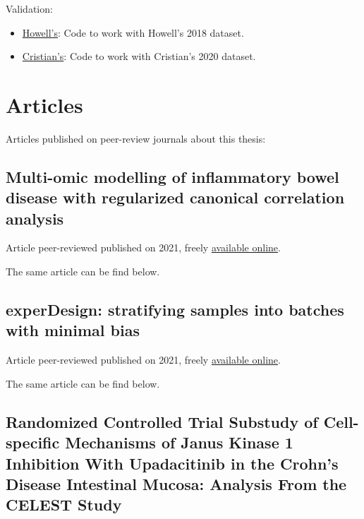 \documentclass[
  12pt,
  a4paper,
  twoside,
  openright]{book}
\providecommand{\tightlist}{%
  \setlength{\itemsep}{0pt}\setlength{\parskip}{0pt}}
\begin{document}
Validation:

\begin{itemize}
\tightlist
\item
  \href{https://github.com/llrs/howell_2018/}{Howell's}: Code to work with Howell's 2018 dataset.
\item
  \href{https://github.com/llrs/cristian_mark/}{Cristian's}: Code to work with Cristian's 2020 dataset.
\end{itemize}

\hypertarget{articles}{%
\chapter{Articles}\label{articles}}

Articles published on peer-review journals about this thesis:

\hypertarget{app-multiomics}{%
\section{Multi-omic modelling of inflammatory bowel disease with regularized canonical correlation analysis}\label{app-multiomics}}


Article peer-reviewed published on 2021, freely \href{https://doi.org/10.1371/journal.pone.0246367}{available online}.

The same article can be find below.



\hypertarget{app-experDesign}{%
\section{experDesign: stratifying samples into batches with minimal bias}\label{app-experDesign}}


Article peer-reviewed published on 2021, freely \href{https://joss.theoj.org/papers/10.21105/joss.03358}{available online}.

The same article can be find below.



\hypertarget{app-upa}{%
\section{Randomized Controlled Trial Substudy of Cell-specific Mechanisms of Janus Kinase 1 Inhibition With Upadacitinib in the Crohn's Disease Intestinal Mucosa: Analysis From the CELEST Study}\label{app-upa}}
\end{document}
